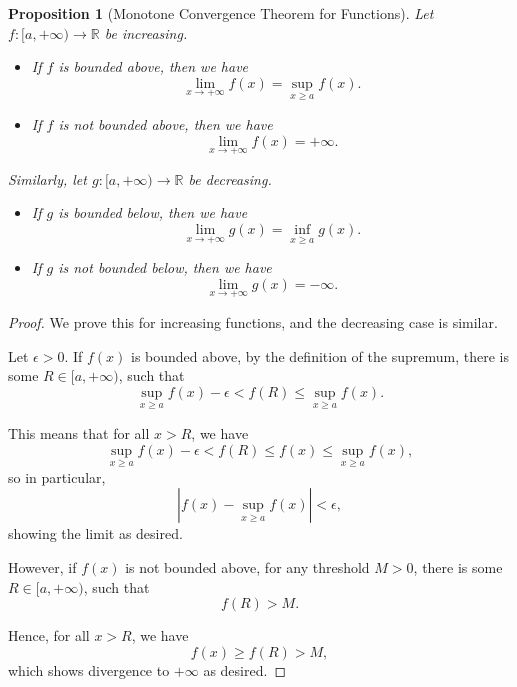 \documentclass[11pt]{article}
\numberwithin{equation}{section}
\newtheorem{proposition}[theorem]{Proposition}
\theoremstyle{definition}
\theoremstyle{remark}
\newcommand{\pqty}[1]{\left(#1\right)}
\newcommand{\abs}[1]{\left|#1\right|}
\newcommand{\cointv}[2]{[#1,#2)}
\newcommand{\functiondomain}[3]{#1:#2\to #3}
\newcommand{\RR}{\mathbb R}
\newcommand{\plusinfty}{+\infty}
\newcommand{\minusinfty}{-\infty}
\begin{document}
\begin{proposition}[Monotone Convergence Theorem for Functions]\label{analysis-unit-0182}
    \label{prop:fn-monotone-convergence-theorem}%
    Let \(\functiondomain{f}{\cointv{a}{\plusinfty}}{\RR}\) be increasing.

    \begin{itemize}
        \item If \(f\) is bounded above, then we have
        \[
            \lim_{x \to \plusinfty} f\pqty{x} = \sup_{x \geq a} f\pqty{x}.
        \]
        \item If \(f\) is not bounded above, then we have
        \[
            \lim_{x \to \plusinfty} f\pqty{x} = \plusinfty.
        \]
    \end{itemize}

    Similarly, let \(\functiondomain{g}{\cointv{a}{\plusinfty}}{\RR}\) be decreasing.

    \begin{itemize}
        \item If \(g\) is bounded below, then we have
        \[
            \lim_{x \to \plusinfty} g\pqty{x} = \inf_{x \geq a} g\pqty{x}.
        \]
        \item If \(g\) is not bounded below, then we have
        \[
            \lim_{x \to \plusinfty} g\pqty{x} = \minusinfty.
        \]
    \end{itemize}
\end{proposition}

\begin{proof}
    We prove this for increasing functions, and the decreasing case is similar.

    Let \(\epsilon > 0\). If \(f\pqty{x}\) is bounded above, by the definition of the supremum, there is some \(R \in \cointv{a}{\plusinfty}\), such that
    \[
        \sup_{x \geq a} f\pqty{x} - \epsilon < f\pqty{R} \leq \sup_{x \geq a} f\pqty{x}.
    \]

    This means that for all \(x > R\), we have
    \[
        \sup_{x \geq a} f\pqty{x} - \epsilon < f\pqty{R} \leq f\pqty{x} \leq \sup_{x \geq a} f\pqty{x},
    \]
    so in particular,
    \[
        \abs{f\pqty{x} - \sup_{x \geq a} f\pqty{x}} < \epsilon,
    \]
    showing the limit as desired.

    However, if \(f\pqty{x}\) is not bounded above, for any threshold \(M > 0\), there is some \(R \in \cointv{a}{\plusinfty}\), such that
    \[
        f\pqty{R} > M.
    \]

    Hence, for all \(x > R\), we have
    \[
        f\pqty{x} \geq f\pqty{R} > M,
    \]
    which shows divergence to \(\plusinfty\) as desired.
\end{proof}
\end{document}
